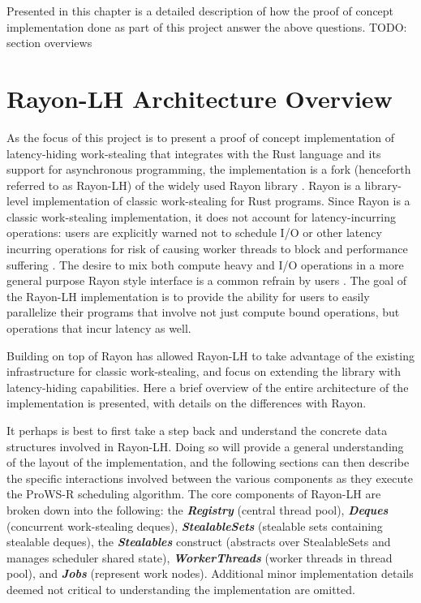 \documentclass[bsc,frontabs,singlespacing,parskip,deptreport,normalheadings]{infthesis}
\begin{document}
Presented in this chapter is a detailed description of how the proof of concept
implementation done as part of this project answer the above questions. TODO:
section overviews

\section{Rayon-LH Architecture Overview}

As the focus of this project is to present a proof of concept implementation of
latency-hiding work-stealing that integrates with the Rust language and its
support for asynchronous programming, the implementation is a fork (henceforth
referred to as Rayon-LH) \cite{weidinger_rayon-lh_2021} of the widely used Rayon
library \cite{noauthor_rayon_2022, noauthor_baby_nodate, stone_how_2021}. Rayon
is a library-level implementation of classic work-stealing for Rust programs.
Since Rayon is a classic work-stealing implementation, it does not account for
latency-incurring operations: users are explicitly warned not to schedule I/O or
other latency incurring operations for risk of causing worker threads to block
and performance suffering \cite{noauthor_rayon_nodate}. The desire to mix both
compute heavy and I/O operations in a more general purpose Rayon style interface
is a common refrain by users \cite{noauthor_does_nodate, rodyamirov_how_2020}.
The goal of the Rayon-LH implementation is to provide the ability for users to
easily parallelize their programs that involve not just compute bound
operations, but operations that incur latency as well.

Building on top of Rayon has allowed Rayon-LH to take advantage of the existing
infrastructure for classic work-stealing, and focus on extending the library
with latency-hiding capabilities. Here a brief overview of the entire
architecture of the implementation is presented, with details on the differences
with Rayon.

It perhaps is best to first take a step back and understand the concrete data
structures involved in Rayon-LH. Doing so will provide a general understanding
of the layout of the implementation, and the following sections can then
describe the specific interactions involved between the various components as
they execute the ProWS-R scheduling algorithm. The core components of Rayon-LH
are broken down into the following: the \textbf{\textit{Registry}} (central
thread pool), \textbf{\textit{Deques}} (concurrent work-stealing deques),
\textbf{\textit{StealableSets}} (stealable sets containing stealable deques),
the \textbf{\textit{Stealables}} construct (abstracts over StealableSets and
manages scheduler shared state), \textbf{\textit{WorkerThreads}} (worker threads
in thread pool), and \textbf{\textit{Jobs}} (represent work nodes). Additional
minor implementation details deemed not critical to understanding the
implementation are omitted.
\end{document}
